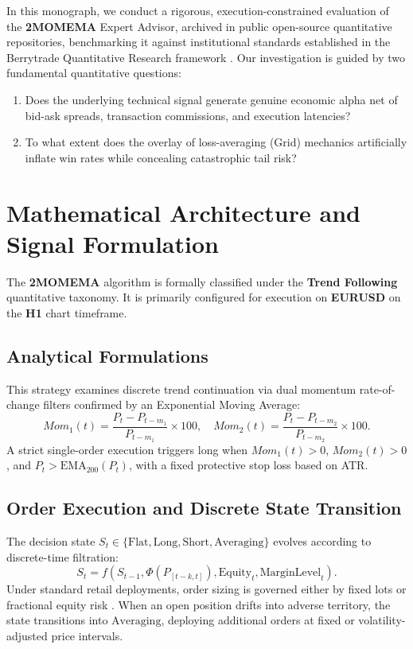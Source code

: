 \documentclass[11pt,a4paper]{article}
\begin{document}
In this monograph, we conduct a rigorous, execution-constrained evaluation of the \textbf{2MOMEMA} Expert Advisor, archived in public open-source quantitative repositories, benchmarking it against institutional standards established in the Berrytrade Quantitative Research framework \cite{artsu2026illusion}. Our investigation is guided by two fundamental quantitative questions:
\begin{enumerate}
    \item Does the underlying technical signal generate genuine economic alpha net of bid-ask spreads, transaction commissions, and execution latencies?
    \item To what extent does the overlay of loss-averaging (Grid) mechanics artificially inflate win rates while concealing catastrophic tail risk?
\end{enumerate}

\section{Mathematical Architecture and Signal Formulation}
The \textbf{2MOMEMA} algorithm is formally classified under the \textbf{Trend Following} quantitative taxonomy. It is primarily configured for execution on \textbf{EURUSD} on the \textbf{H1} chart timeframe.

\subsection{Analytical Formulations}

This strategy examines discrete trend continuation via dual momentum rate-of-change filters confirmed by an Exponential Moving Average:
\begin{equation}
Mom_1(t) = \frac{P_t - P_{t-m_1}}{P_{t-m_1}} \times 100, \quad Mom_2(t) = \frac{P_t - P_{t-m_2}}{P_{t-m_2}} \times 100.
\end{equation}
A strict single-order execution triggers long when $Mom_1(t) > 0$, $Mom_2(t) > 0$, and $P_t > \text{EMA}_{200}(P_t)$, with a fixed protective stop loss based on ATR.


\subsection{Order Execution and Discrete State Transition}
The decision state $S_t \in \{\text{Flat}, \text{Long}, \text{Short}, \text{Averaging}\}$ evolves according to discrete-time filtration:
\begin{equation}
S_{t} = f(S_{t-1}, \Phi(P_{[t-k, t]}), \text{Equity}_t, \text{MarginLevel}_t).
\end{equation}
Under standard retail deployments, order sizing is governed either by fixed lots or fractional equity risk \cite{lopez2018advances, carhart1997persistence}. When an open position drifts into adverse territory, the state transitions into $\text{Averaging}$, deploying additional orders at fixed or volatility-adjusted price intervals.
\end{document}
